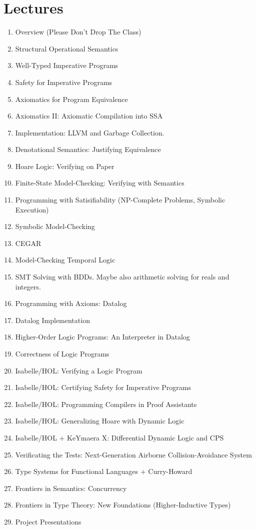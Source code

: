 \documentclass{article}
\begin{document}
\section*{Lectures}
\begin{enumerate}
\item Overview (Please Don't Drop The Class)
\item Structural Operational Semantics
\item Well-Typed Imperative Programs
\item Safety for Imperative Programs
\item Axiomatics for Program Equivalence
\item Axiomatics II: Axiomatic Compilation into SSA
\item Implementation: LLVM and Garbage Collection.
\item Denotational Semantics: Justifying Equivalence
\item Hoare Logic: Verifying on Paper
\item Finite-State Model-Checking: Verifying with Semantics
\item Programming with Satisifiability (NP-Complete Problems, Symbolic Execution) 
\item Symbolic Model-Checking
\item CEGAR
\item Model-Checking Temporal Logic
\item SMT Solving with BDDs. Maybe also arithmetic solving for reals and integers.
\item Programming with Axioms: Datalog
\item Datalog Implementation 
\item Higher-Order Logic Programs: An Interpreter in Datalog
\item Correctness of Logic Programs
\item Isabelle/HOL: Verifying a Logic Program
\item Isabelle/HOL: Certifying Safety for Imperative Programs
\item Isabelle/HOL: Programming Compilers in Proof Assistants
\item Isabelle/HOL: Generalizing Hoare with Dynamic Logic
\item Isabelle/HOL + KeYmaera X: Differential Dynamic Logic and CPS
\item Verificating the Tests: Next-Generation Airborne Collision-Avoidance System
\item Type Systems for Functional Languages + Curry-Howard
\item Frontiers in Semantics: Concurrency
\item Frontiers in Type Theory: New Foundations (Higher-Inductive Types)
\item Project Presentations
\end{enumerate}

\end{document}
